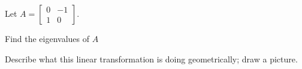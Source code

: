 \begin{applicationActivities}{4}{28}
\begin{activity}{10}
Let  $A=\begin{bmatrix}0 & -1 \\ 1 & 0 \end{bmatrix}$.
\begin{subactivity}
  Find the eigenvalues of $A$
  \end{subactivity}
  \begin{subactivity}
   Describe what this linear transformation is doing geometrically; draw a picture.
   \end{subactivity}
\end{activity}



\end{applicationActivities}
